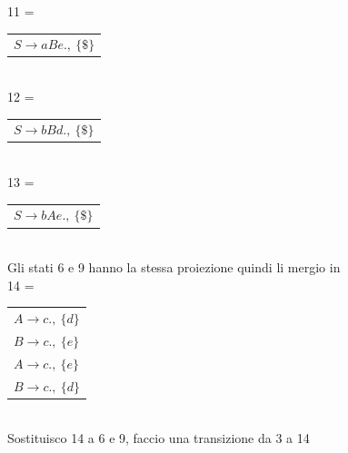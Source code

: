 11 =
\begin{tabular}{l}
	$S \rightarrow aBe.,\  \{ \$ \}$	\\
\end{tabular}\\[5pt]

12 =
\begin{tabular}{l}
	$S \rightarrow bBd.,\  \{ \$ \}$	\\
\end{tabular}\\[5pt]

13 =
\begin{tabular}{l}
	$S \rightarrow bAe.,\  \{ \$ \}$	\\
\end{tabular}\\[5pt]

Gli stati 6 e 9 hanno la stessa proiezione quindi li mergio in \\

14 = 
\begin{tabular}{l}
	$A \rightarrow c.,\  \{ d \}$	\\
	$B \rightarrow c.,\  \{ e \}$	\\
	$A \rightarrow c.,\  \{ e \}$	\\
	$B \rightarrow c.,\  \{ d \}$	\\
\end{tabular}\\[5pt]

Sostituisco 14 a 6 e 9, faccio una transizione da 3 a 14


